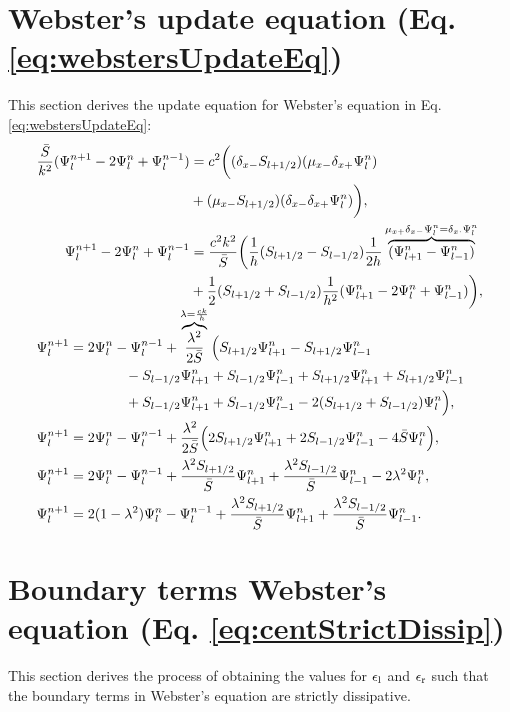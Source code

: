 \section{Webster's update equation (Eq. \eqref{eq:webstersUpdateEq})}\label{app:webstersUpdateEq}
This section derives the update equation for Webster's equation in Eq. \eqref{eq:webstersUpdateEq}:
\begin{align*}
    &\begin{aligned}
    \frac{\bar{S}}{k^2}(\Psi_l^{n+1} - 2\Psi_l^n+\Psi_l^{n-1}) &= c^2\bigg((\delta_{x-} S_{l+1/2})(\mu_{x-} \delta_{x+} \Psi_l^n)\\
    & + (\mu_{x-} S_{l+1/2})(\delta_{x-} \delta_{x+} \Psi_l^n)\bigg),\\
    \Psi_l^{n+1} - 2\Psi_l^n+\Psi_l^{n-1} &= \frac{c^2k^2}{\bar{S}}\bigg(\frac{1}{h}(S_{l+1/2} - S_{l-1/2})\frac{1}{2h}\overbrace{(\Psi_{l+1}^n -\Psi_{l-1}^n)}^{\mu_{x+}\delta_{x-}\Psi_l^n = \delta_{x\cdot}\Psi_l^n}\nonumber\\
    &+\frac{1}{2}(S_{l+1/2} + S_{l-1/2})\frac{1}{h^2}(\Psi_{l+1}^n-2\Psi_l^n+\Psi_{l-1}^n)\bigg),
    \end{aligned}\\[-0.5em]
    &\begin{aligned}
        \Psi_l^{n+1} &= 2\Psi_l^n -\Psi_l^{n-1} +\overbrace{\frac{\lambda^2}{2\bar{S}}}^{\lambda = \frac{ck}{h}}\Big(S_{l+1/2}\Psi_{l+1}^n - S_{l+1/2}\Psi_{l-1}^n\\
        &\qquad\qquad - S_{l-1/2}\Psi_{l+1}^n + S_{l-1/2}\Psi_{l-1}^n+ S_{l+1/2}\Psi_{l+1}^n + S_{l+1/2}\Psi_{l-1}^n \\
        &\qquad\qquad + S_{l-1/2}\Psi_{l+1}^n + S_{l-1/2}\Psi_{l-1}^n - 2 (S_{l+1/2} + S_{l-1/2})\Psi_l^n\Big)\nonumber,\\
        \Psi_l^{n+1} &= 2\Psi_l^n-\Psi_l^{n-1}+ \frac{\lambda^2}{2\bar{S}}\Big(2S_{l+1/2}\Psi_{l+1}^n + 2S_{l-1/2}\Psi_{l-1}^n - 4\bar{S}\Psi_l^n\Big)\nonumber,\\
        \Psi_l^{n+1} &= 2\Psi_l^n-\Psi_l^{n-1}+ \frac{\lambda^2S_{l+1/2}}{\bar{S}}\Psi_{l+1}^n + \frac{\lambda^2S_{l-1/2}}{\bar{S}}\Psi_{l-1}^n - 2\lambda^2\Psi_l^n\nonumber,\\
        \Psi_l^{n+1} &= 2(1-\lambda^2)\Psi_l^n-\Psi_l^{n-1}+ \frac{\lambda^2S_{l+1/2}}{\bar{S}}\Psi_{l+1}^n + \frac{\lambda^2S_{l-1/2}}{\bar{S}}\Psi_{l-1}^n.
    \end{aligned}
\end{align*}

\section{Boundary terms Webster's equation (Eq. \eqref{eq:centStrictDissip})}\label{app:boundaryWebster}
This section derives the process of obtaining the values for $\epsilon_\text{l}$ and $\epsilon_\text{r}$ such that the boundary terms in Webster's equation are strictly dissipative. 

